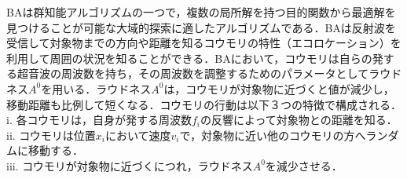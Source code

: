 \documentclass{jarticle}
\begin{document}
BAは群知能アルゴリズムの一つで，複数の局所解を持つ目的関数から最適解を見つけることが可能な大域的探索に適したアルゴリズムである．BAは反射波を受信して対象物までの方向や距離を知るコウモリの特性（エコロケーション）を利用して周囲の状況を知ることができる．BAにおいて，コウモリは自らの発する超音波の周波数を持ち，その周波数を調整するためのパラメータとしてラウドネス${A^0}$を用いる．ラウドネス${A^0}$は，コウモリが対象物に近づくと値が減少し，移動距離も比例して短くなる．コウモリの行動は以下３つの特徴で構成される．\\
i.	各コウモリは，自身が発する周波数${f_i}$の反響によって対象物との距離を知る．\\
ii.	コウモリは位置${x_i}$において速度${v_i}$で，対象物に近い他のコウモリの方へランダムに移動する．\\
iii.	コウモリが対象物に近づくにつれ，ラウドネス${A^0}$を減少させる．
\end{document}
